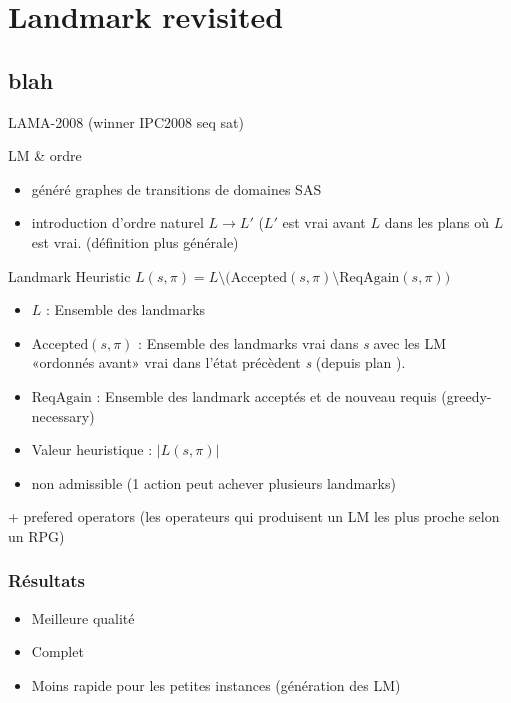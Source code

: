 \section{Landmark revisited}
  \subsection*{blah}

\begin{frame}
  
  \begin{block}{}
    LAMA-2008 (winner IPC2008 seq sat)
    
  \end{block}

  \begin{block}{LM \& ordre}
    \begin{itemize}
      \item généré graphes de transitions de domaines SAS\up{+}
      \item introduction d'ordre naturel $L → L'$ ($L'$ est vrai avant $L$ dans les plans où $L$ est vrai. (définition plus générale)
    \end{itemize}

  \end{block}
\end{frame}

\begin{frame}
  \begin{block}{Landmark Heuristic}
    $L(s, \pi) = L \setminus \big(\text{Accepted}(s, \pi) \setminus \text{ReqAgain}(s, \pi)\big)$
    \begin{itemize}
      \item $L$ : Ensemble des landmarks
      \item $\text{Accepted}(s, \pi)$ : Ensemble des landmarks vrai dans \emph{s} avec les LM «ordonnés avant» vrai dans l'état précèdent \emph{s} (depuis plan \pi).
      \item $\text{ReqAgain}$ : Ensemble des landmark acceptés et de nouveau requis (greedy-necessary)
      \item Valeur heuristique : $|L(s, \pi)|$
      \item \alert{non admissible} (1 action peut achever plusieurs landmarks)
    \end{itemize}

    + prefered operators (les operateurs qui produisent un LM les plus proche selon un RPG)
  \end{block}
\end{frame}

\begin{frame}
  \frametitle{Résultats}

  \begin{block}{}
    \begin{itemize}
      \item Meilleure qualité
      \item Complet
      \item Moins rapide pour les petites instances (génération des LM)
    \end{itemize}
  \end{block}
\end{frame}
